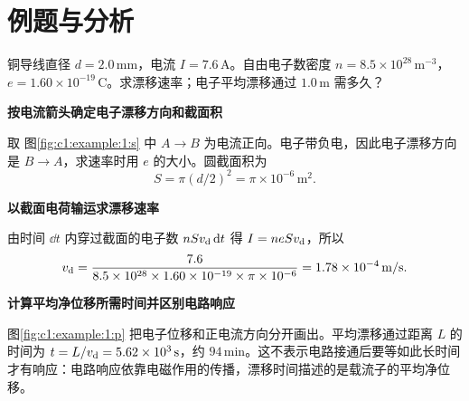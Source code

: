 \section{例题与分析}

\begin{question}\begin{example}[铜导线中的漂移速度]\label{c1:example:1}
铜导线直径 $d=2.0\,\mathrm{mm}$，电流 $I=7.6\,\mathrm A$。自由电子数密度 $n=8.5\times10^{28}\,\mathrm{m^{-3}}$，$e=1.60\times10^{-19}\,\mathrm C$。求漂移速率；电子平均漂移通过 $1.0\,\mathrm m$ 需多久？
\end{example}
\end{question}
\begin{solution}\textbf{按电流箭头确定电子漂移方向和截面积}\par\nobreak
取 图\ref{fig:c1:example:1:s} 中 $A\to B$ 为电流正向。电子带负电，因此电子漂移方向是 $B\to A$，求速率时用 $e$ 的大小。圆截面积为
\[
 S=\pi(d/2)^2=\pi\times10^{-6}\,\mathrm{m^2}.
\]


\par\medskip{}\noindent\textbf{以截面电荷输运求漂移速率}\par\nobreak
由时间 $\dd t$ 内穿过截面的电子数 $nSv_{\rm d}\mathop{}\!\mathrm d t$ 得 $I=neSv_{\rm d}$，所以
\[
 v_{\rm d}=\frac{7.6}{8.5\times10^{28}\times1.60\times10^{-19}\times\pi\times10^{-6}}
 =1.78\times10^{-4}\,\mathrm{m/s}.
\]



\par\medskip{}\noindent\textbf{计算平均净位移所需时间并区别电路响应}\par\nobreak
图\ref{fig:c1:example:1:p} 把电子位移和正电流方向分开画出。平均漂移通过距离 $L$ 的时间为 $t=L/v_{\rm d}=5.62\times10^3\,\mathrm s$，约 $94\,\mathrm{min}$。这不表示电路接通后要等如此长时间才有响应：电路响应依靠电磁作用的传播，漂移时间描述的是载流子的平均净位移。\end{solution}
